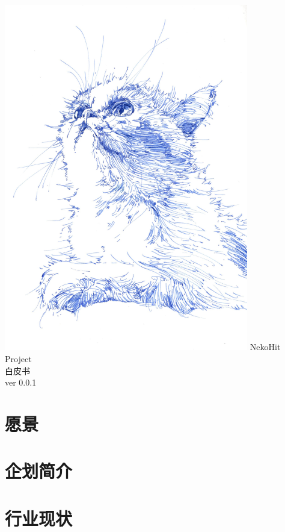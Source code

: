\documentclass[11pt,UTF8,a4paper]{ctexart}
\begin{document}
    \begin{titlepage}
        \centering
        \vfill
        \includegraphics[width=0.8\textwidth]{assets/img196}
        \vfill
        {\Huge
        \textsf{NekoHit Project}\\
        白皮书\\
        \vskip2cm
        \vfill
        \Large
        ver 0.0.1
        }
        \vfill
        \vfill
    \end{titlepage}
    \tableofcontents
    \clearpage

    \section{愿景}\label{sec:goal}


    \section{企划简介}\label{sec:intro}


    \section{行业现状}\label{sec:now}
\end{document}
